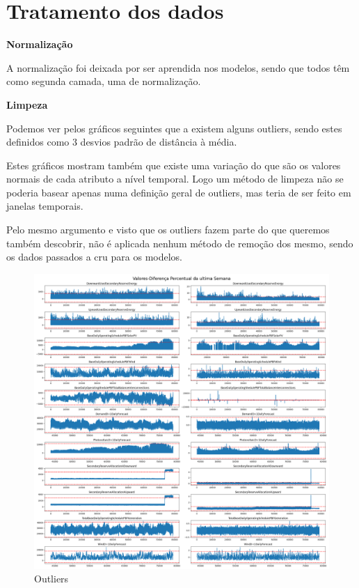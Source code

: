 


\section{Tratamento dos dados}

\textbf{Normalização} \par
A normalização foi deixada por ser aprendida nos modelos, sendo que todos têm como segunda camada, uma de normalização.\par

\textbf{Limpeza} \par

Podemos ver pelos gráficos seguintes que a existem alguns outliers, sendo estes definidos como 3 desvios padrão de distância à média.\par
Estes gráficos mostram também que existe uma variação do que são os valores normais de cada atributo a nível temporal. Logo um método de limpeza não se poderia basear apenas numa definição geral de outliers, mas teria de ser feito em janelas temporais.\par
Pelo mesmo argumento e visto que os outliers fazem parte do que queremos também descobrir, não é aplicada nenhum método de remoção dos mesmo, sendo os dados passados a cru para os modelos.\par


\begin{figure}[H]
  \centering
  \includegraphics[width=\textwidth]{plots/Outliers_3stds.png}
  \caption{Outliers}
\end{figure}

